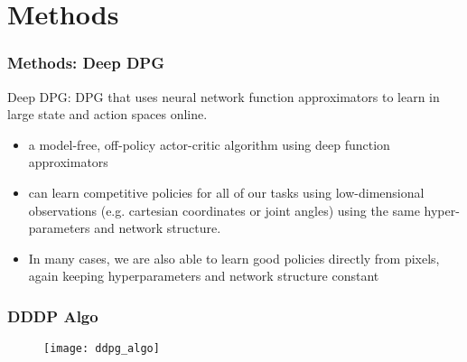 \section{Methods}

\begin{frame}
\frametitle{Methods: Deep DPG}

Deep DPG:
DPG that uses neural network function approximators to
learn in large state and action spaces online.
\begin{itemize}
  \item a model-free, off-policy actor-critic algorithm using deep function approximators
  \item can learn competitive policies for all of our tasks using low-dimensional observations
  (e.g. cartesian coordinates or joint angles) using the same hyper-parameters and network structure.
  \item In many cases, we are also able to learn good policies directly from pixels, again keeping hyperparameters and network structure constant
\end{itemize}
\end{frame}

\begin{frame}
\frametitle{DDDP Algo}
\begin{figure}
    \centering
    \texttt{[image: ddpg\_algo]}
\end{figure}
\end{frame}
